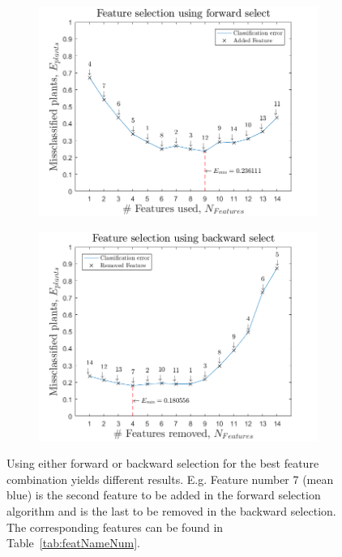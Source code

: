 \begin{figure}[H]
    \centering
    \begin{subfigure}[b]{0.47\textwidth}
        \centering
        \includegraphics[width=\textwidth]{./figure/result/Quadratic/forward.png}
    \end{subfigure}
    \begin{subfigure}[b]{0.47\textwidth}
        \centering
        \includegraphics[width=\textwidth]{./figure/result/Quadratic/backward.png}
    \end{subfigure}
    \caption{\label{fig:backforSelection} Using either forward or backward selection for the best feature combination yields different results. E.g. Feature number 7 (mean blue) is the second feature to be added in the forward selection algorithm and is the last to be removed in the backward selection. The corresponding features can be found in Table~\ref{tab:featNameNum}.}
\end{figure}

